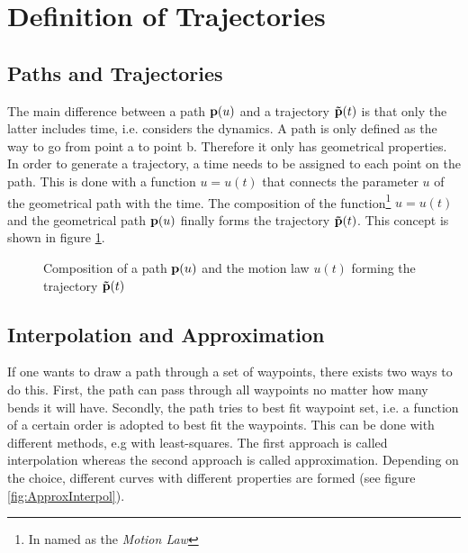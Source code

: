 \section{Definition of Trajectories}
\label{sec:definition}
\subsection{Paths and Trajectories}
The main difference between a path $ {\bf p}(u)$ and a trajectory $ {\bf \tilde{p}}(t)$ is that only the latter includes time, i.e. considers the dynamics. A path is only defined as the way to go from point a to point b. Therefore it only has geometrical properties. In order to generate a trajectory, a time needs to be assigned to each point on the path. This is done with a function $u=u(t)$ that connects the parameter $u$ of the geometrical path with the time. The composition of the function\footnote{In  \cite{snider} named as the \textit{Motion Law}} $u=u(t)$ and the geometrical path ${\bf p}(u)$ finally forms the trajectory ${\bf \tilde{p}}(t)$. This concept is shown in figure \ref{fig:path_trajectory}.
\begin{figure}[h]
\centering
\def\svgwidth{0.9\textwidth}

\caption{Composition of a path ${\bf p}(u)$ and the motion law $u(t)$ forming the trajectory ${\bf \tilde{p}}(t)$}
\label{fig:path_trajectory}
\end{figure}



\subsection{Interpolation and Approximation}
If one wants to draw a path through a set of waypoints, there exists two ways to do this. First, the path can pass through all waypoints no matter how many bends it will have. Secondly, the path tries to best fit waypoint set, i.e. a function of a  certain order is adopted to best fit the waypoints. This can be done with different methods, e.g with least-squares. The first approach is called interpolation whereas the second approach is called approximation. Depending on the choice, different curves with different properties are formed (see figure \ref{fig:ApproxInterpol}).  


